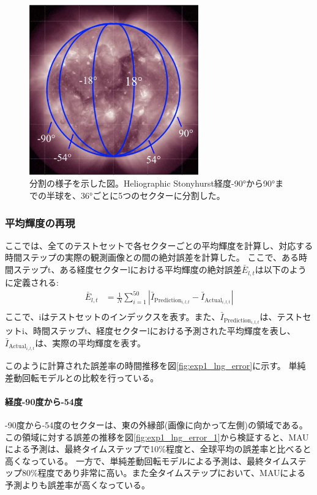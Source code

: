         \begin{figure}[htbp]
          \centering
          \includegraphics[width=0.65\textwidth]{figures/exp1/devision_caption.jpg}
          \caption{分割の様子を示した図。Heliographic Stonyhurst経度-90°から90°までの半球を、36°ごとに5つのセクターに分割した。}
          \label{fig:exp1_division_concept}
        \end{figure}

        \subsubsection{平均輝度の再現}
          ここでは、全てのテストセットで各セクターごとの平均輝度を計算し、対応する時間ステップの実際の観測画像との間の絶対誤差を計算した。
          ここで、ある時間ステップt、ある経度セクターlにおける平均輝度の絶対誤差\( \bar{E}_{l,t} \)は以下のように定義される:
          \begin{align}
            \bar{E}_{l, t} & = \frac{1}{N} \sum_{i=1}^{50} | \bar{I}_{\text{Prediction}_ {i, l, t}} - \bar{I}_{\text{Actual}_{i, l, t}} | \\
          \end{align}
          ここで、iはテストセットのインデックスを表す。また、\( \bar{I}_{\text{Prediction}_{i, l, t}} \)は、テストセットi、時間ステップt、経度セクターlにおける予測された平均輝度を表し、\( \bar{I}_{\text{Actual}_{i, l, t}} \)は、実際の平均輝度を表す。  
            
          このように計算された誤差率の時間推移を図\ref{fig:exp1_lng_error}に示す。
          単純差動回転モデルとの比較を行っている。
          
          \paragraph{経度-90度から-54度}
          -90度から-54度のセクターは、東の外縁部(画像に向かって左側)の領域である。
          この領域に対する誤差の推移を図\ref{fig:exp1_lng_error_1}から検証すると、MAUによる予測は、最終タイムステップで10\%程度と、全球平均の誤差率と比べると高くなっている。
          一方で、単純差動回転モデルによる予測は、最終タイムステップ80\%程度であり非常に高い。また全タイムステップにおいて、MAUによる予測よりも誤差率が高くなっている。

